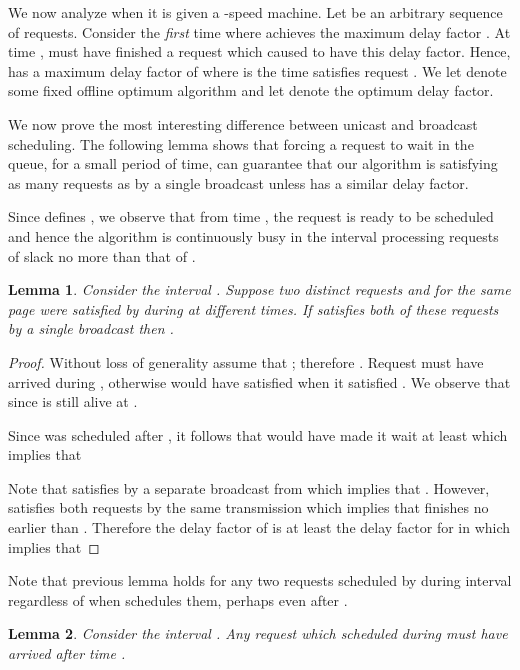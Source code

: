 \documentclass[11pt]{article}
\newtheorem{lemma}{Lemma}[section]
\begin{document}
We now analyze  when it is given a -speed
machine. Let  be an arbitrary sequence of requests. Consider
the \emph{first} time  where  achieves the maximum delay
factor . At time ,  must have finished a
request  which caused  to have this delay
factor. Hence,  has a maximum delay factor of  where  is the time  satisfies
request . We let  denote some fixed offline optimum
algorithm and let  denote the optimum delay factor.

We now prove the most interesting difference between unicast and
broadcast scheduling. The following lemma shows that forcing a request
to wait in the queue, for a small period of time, can guarantee that
our algorithm is satisfying as many requests as  by a single
broadcast unless  has a similar delay factor.

Since  defines , we observe that from time
, the request
 is ready to be scheduled and hence the algorithm is
continuously busy in the interval  processing
requests of slack no more than that of .

\begin{lemma}
  \label{lem:main}
  Consider the interval . Suppose two distinct
  requests  and  for the same page  were
  satisfied by  during  at different times. If 
  satisfies both of these requests by a single broadcast then
  .
\end{lemma}

\begin{proof}
  Without loss of generality assume that ; therefore . Request  must have arrived during ,
  otherwise  would have satisfied  when it satisfied
  . We observe that  since  is
  still alive at .

  Since  was scheduled after , it follows that  would
  have made it wait at least  which implies
  that
  
  Note that  satisfies  by a separate broadcast from
   which implies that . However, 
  satisfies both requests by the same transmission which implies
  that  finishes  no earlier than . Therefore
  the delay factor of  is at least the delay factor for  in
   which implies that

\end{proof}

Note that previous lemma holds for any two requests scheduled by
 during interval  regardless of when  schedules them,
perhaps even after .

\begin{lemma}
  \label{lem:arrivaltime}
  Consider the interval . Any request which
   scheduled during  must have arrived after time .
\end{lemma}
\end{document}
